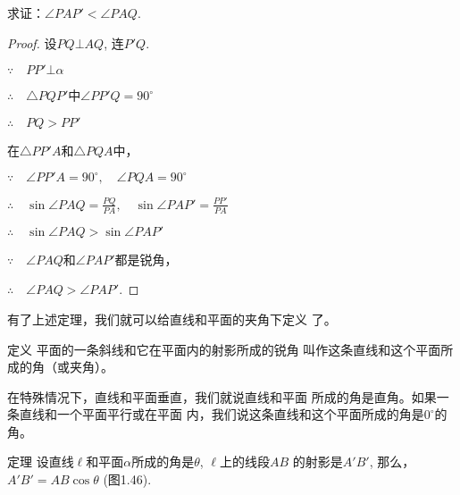 求证：$\angle PAP'<\angle PAQ$.

\begin{figure}[htp]
  \centering
{}
  \caption{}
\end{figure}

\begin{proof}
  设$PQ\bot AQ$, 连$P'Q$.

  $\because\quad PP'\bot\alpha$

$\therefore\quad \triangle PQP'$中$\angle PP'Q=90^{\circ}$

$\therefore\quad PQ>PP'$

在$\triangle PP'A$和$\triangle PQA$中，

$\because\quad \angle PP'A=90^{\circ},\quad \angle PQA=90^{\circ}$

$\therefore\quad \sin\angle PAQ=\frac{PQ}{PA},\quad \sin\angle PAP'=\frac{PP'}{PA}$

$\therefore\quad \sin\angle  PAQ>\sin\angle PAP'$

$\because\quad \angle PAQ$和$\angle PAP'$都是锐角，

$\therefore\quad \angle PAQ>\angle PAP'$.
\end{proof}

有了上述定理，我们就可以给直线和平面的夹角下定义
了。


\begin{blk}
  {定义} 平面的一条斜线和它在平面内的射影所成的锐角
叫作这条直线和这个平面所成的角（或夹角）。
\end{blk}

在特殊情况下，直线和平面垂直，我们就说直线和平面
所成的角是直角。如果一条直线和一个平面平行或在平面
内，我们说这条直线和这个平面所成的角是$0^{\circ}$的角。


\begin{blk}
  {定理} 设直线$\ell$和平面$\alpha$所成的角是$\theta$, $\ell$上的线段$AB$
的射影是$A'B'$, 那么，
$A'B'=AB\cos\theta$ (图1.46).
\end{blk}


